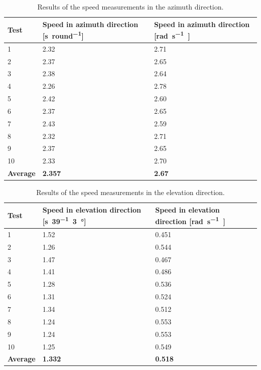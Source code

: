\begin{table}[h!]
	\centering
	\caption{Results of the speed measurements in the azimuth direction.}

	\begin{tabularx}{\textwidth}{lXX}\label{tab_appendix:speed_azimuth}
		Test 				& Speed in azimuth direction [\si{\second\per round}]			&  Speed in azimuth direction [\si{\radian\per\second]}			\\ \toprule \rowcolor{lightGrey}
		1	& 2.32 & 2.71						\\
		2	& 2.37	& 2.65		\\ \rowcolor{lightGrey}
		3	& 2.38 & 2.64 \\
		4	& 2.26 & 2.78 \\ \rowcolor{lightGrey}
		5 	& 2.42 & 2.60 \\
		6	& 2.37 & 2.65 \\\rowcolor{lightGrey}
		7	& 2.43 & 2.59 \\
		8	& 2.32 & 2.71 \\ \rowcolor{lightGrey}
		9	& 2.37 & 2.65 \\
		10	& 2.33 & 2.70 \\\rowcolor{lightGrey}
		\textbf{Average} & \textbf{2.357} & \textbf{2.67} 
	\end{tabularx}
\end{table}

\begin{table}[h!]
	\centering
	\caption{Results of the speed measurements in the elevation direction.}\label{tab_appendix:speed_elevation}

	\begin{tabularx}{\textwidth}{lXX}
		Test 				& Speed in elevation direction [\si{\second\per 39.3 \degree}]		&  Speed in elevation direction [\si{\radian\per\second]}			\\ \toprule \rowcolor{lightGrey}
		1	& 1.52 & 0.451						\\
		2	& 1.26 & 0.544		\\ \rowcolor{lightGrey}
		3	& 1.47 & 0.467 \\
		4	& 1.41 & 0.486 \\ \rowcolor{lightGrey}
		5 	& 1.28 & 0.536 \\
		6	& 1.31 & 0.524 \\\rowcolor{lightGrey}
		7	& 1.34 & 0.512 \\
		8	& 1.24 & 0.553 \\ \rowcolor{lightGrey}
		9	& 1.24 & 0.553 \\
		10	& 1.25 & 0.549 \\\rowcolor{lightGrey}
		\textbf{Average} & \textbf{1.332} & \textbf{0.518} 
	\end{tabularx}
\end{table}

